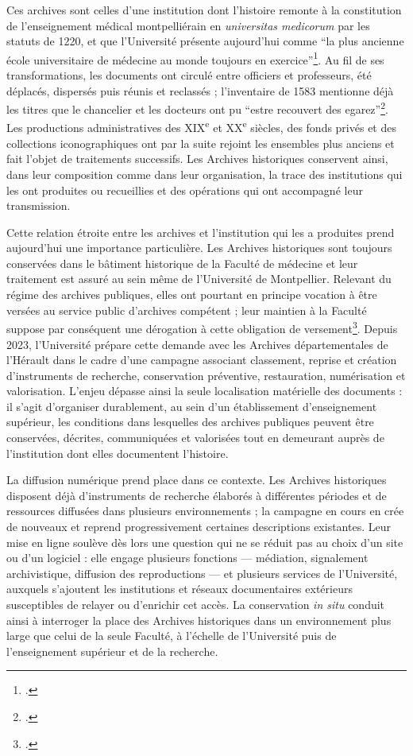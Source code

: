 Ces archives sont celles d'une institution dont l'histoire remonte à la constitution de l'enseignement médical montpelliérain en \emph{universitas medicorum} par les statuts de 1220, et que l'Université présente aujourd'hui comme \enquote{la plus ancienne école universitaire de médecine au monde toujours en exercice}\footcite{UM800Ans2020}. Au fil de ses transformations, les documents ont circulé entre officiers et professeurs, été déplacés, dispersés puis réunis et reclassés ; l'inventaire de 1583 mentionne déjà les titres que le chancelier et les docteurs ont pu \enquote{estre recouvert des egarez}\footcite[p.~XII, vue~31/1131]{CalmetteCartulaire1912}. Les productions administratives des XIX\textsuperscript{e} et XX\textsuperscript{e} siècles, des fonds privés et des collections iconographiques ont par la suite rejoint les ensembles plus anciens et fait l'objet de traitements successifs. Les Archives historiques conservent ainsi, dans leur composition comme dans leur organisation, la trace des institutions qui les ont produites ou recueillies et des opérations qui ont accompagné leur transmission.

Cette relation étroite entre les archives et l'institution qui les a produites prend aujourd'hui une importance particulière. Les Archives historiques sont toujours conservées dans le bâtiment historique de la Faculté de médecine et leur traitement est assuré au sein même de l'Université de Montpellier. Relevant du régime des archives publiques, elles ont pourtant en principe vocation à être versées au service public d'archives compétent ; leur maintien à la Faculté suppose par conséquent une dérogation à cette obligation de versement\footcite[art.~L.~211-4, L.~212-4, I, et R.~212-12]{CodePatrimoine}. Depuis 2023, l'Université prépare cette demande avec les Archives départementales de l'Hérault dans le cadre d'une campagne associant classement, reprise et création d'instruments de recherche, conservation préventive, restauration, numérisation et valorisation. L'enjeu dépasse ainsi la seule localisation matérielle des documents : il s'agit d'organiser durablement, au sein d'un établissement d'enseignement supérieur, les conditions dans lesquelles des archives publiques peuvent être conservées, décrites, communiquées et valorisées tout en demeurant auprès de l'institution dont elles documentent l'histoire.

La diffusion numérique prend place dans ce contexte. Les Archives historiques disposent déjà d'instruments de recherche élaborés à différentes périodes et de ressources diffusées dans plusieurs environnements ; la campagne en cours en crée de nouveaux et reprend progressivement certaines descriptions existantes. Leur mise en ligne soulève dès lors une question qui ne se réduit pas au choix d'un site ou d'un logiciel : elle engage plusieurs fonctions --- médiation, signalement archivistique, diffusion des reproductions --- et plusieurs services de l'Université, auxquels s'ajoutent les institutions et réseaux documentaires extérieurs susceptibles de relayer ou d'enrichir cet accès. La conservation \emph{in situ} conduit ainsi à interroger la place des Archives historiques dans un environnement plus large que celui de la seule Faculté, à l'échelle de l'Université puis de l'enseignement supérieur et de la recherche.

